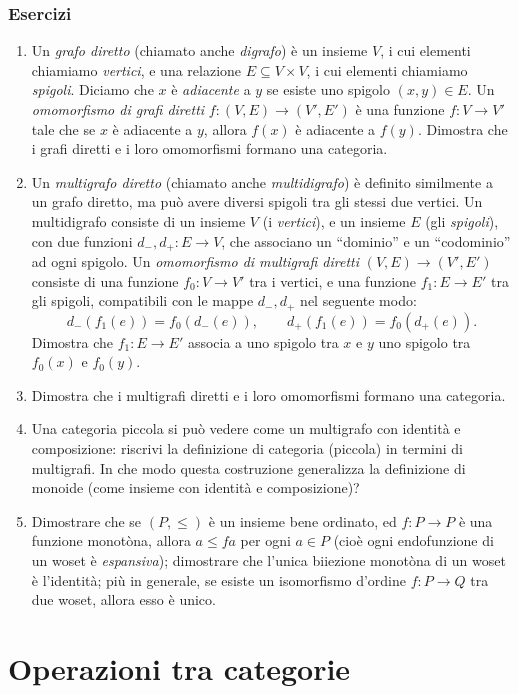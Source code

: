 \subsubsection*{Esercizi}
\begin{enumerate}
	\item Un \emph{grafo diretto} (chiamato anche \emph{digrafo}) è un insieme \(V\), i cui elementi chiamiamo \emph{vertici}, e una relazione \(E\subseteq V\times V\), i cui elementi chiamiamo \emph{spigoli}. Diciamo che \(x\) è \emph{adiacente} a \(y\) se esiste uno spigolo \((x,y)\in E\). Un \emph{omomorfismo di grafi diretti} \(f:(V,E)\to (V',E')\) è una funzione \(f:V\to V'\) tale che se \(x\) è adiacente a \(y\), allora \(f(x)\) è adiacente a \(f(y)\). Dimostra che i grafi diretti e i loro omomorfismi formano una categoria.
	\item Un \emph{multigrafo diretto} (chiamato anche \emph{multidigrafo}) è definito similmente a un grafo diretto, ma può avere diversi spigoli tra gli stessi due vertici. Un multidigrafo consiste di un insieme \(V\) (i \emph{vertici}), e un insieme \(E\) (gli \emph{spigoli}), con due funzioni \(d_-,d_+:E\to V\), che associano un ``dominio'' e un ``codominio'' ad ogni spigolo. Un \emph{omomorfismo di multigrafi diretti} \((V,E)\to (V',E')\) consiste di una funzione \(f_0:V\to V'\) tra i vertici, e una funzione \(f_1:E\to E'\) tra gli spigoli, compatibili con le mappe \(d_-,d_+\) nel seguente modo:
	      \[
		      d_-(f_1(e)) = f_0(d_-(e)) ,\qquad d_+(f_1(e)) = f_0(d_+(e)) .
	      \]
	      Dimostra che \(f_1:E\to E'\) associa a uno spigolo tra \(x\) e \(y\) uno spigolo tra \(f_0(x)\) e \(f_0(y)\).
	\item Dimostra che i multigrafi diretti e i loro omomorfismi formano una categoria.
	\item Una categoria piccola si può vedere come un multigrafo con identità e composizione: riscrivi la definizione di categoria (piccola) in termini di multigrafi.  In che modo questa costruzione generalizza la definizione di monoide (come insieme con identità e composizione)?
	\item Dimostrare che  se \((P,\le)\) è un insieme bene ordinato, ed \(f : P\to P\) è una funzione monotòna, allora \(a\le fa\) per ogni \(a\in P\) (cioè ogni endofunzione di un woset è \emph{espansiva}); dimostrare che l'unica biiezione monotòna di un woset è l'identità; più in generale, se esiste un isomorfismo d'ordine \(f : P\to Q\) tra due woset, allora esso è unico.
\end{enumerate}
\section{Operazioni tra categorie}\label{sec_operazioni}

